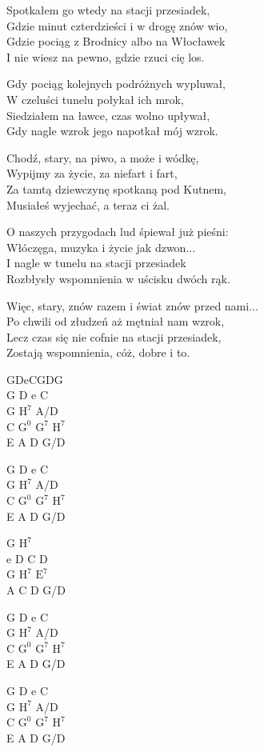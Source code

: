\begin{text}
    \hfill\break
    Spotkałem go wtedy na stacji przesiadek,\\
    Gdzie minut czterdzieści i w drogę znów wio,\\
    Gdzie pociąg z Brodnicy albo na Włocławek\\
    I nie wiesz na pewno, gdzie rzuci cię los.

    Gdy pociąg kolejnych podróżnych wypluwał,\\
    W czeluści tunelu połykał ich mrok,\\
    Siedziałem na ławce, czas wolno upływał,\\
    Gdy nagle wzrok jego napotkał mój wzrok.

    \vin Chodź, stary, na piwo, a może i wódkę,\\
    \vin Wypijmy za życie, za niefart i fart,\\
    \vin Za tamtą dziewczynę spotkaną pod Kutnem,\\
    \vin Musiałeś wyjechać, a teraz ci żal.

    O naszych przygodach lud śpiewał już pieśni:\\
    Włóczęga, muzyka i życie jak dzwon...\\
    I nagle w tunelu na stacji przesiadek\\
    Rozbłysły wspomnienia w uścisku dwóch rąk.

    Więc, stary, znów razem i świat znów przed nami...\\
    Po chwili od złudzeń aż mętniał nam wzrok,\\
    Lecz czas się nie cofnie na stacji przesiadek,\\
    Zostają wspomnienia, cóż, dobre i to.
\end{text}
\begin{chord}
    GDeCGDG\\
    G D e C\\
    G $\mathrm{H^7}$ A/D\\
    C $\mathrm{G^0}$ $\mathrm{G^7}$ $\mathrm{H^7}$\\
    E A D G/D

    G D e C\\
    G $\mathrm{H^7}$ A/D\\
    C $\mathrm{G^0}$ $\mathrm{G^7}$ $\mathrm{H^7}$\\
    E A D G/D

    G $\mathrm{H^7}$\\
    e D C D\\
    G $\mathrm{H^7}$ $\mathrm{E^7}$\\
    A C D G/D

    G D e C\\
    G $\mathrm{H^7}$ A/D\\
    C $\mathrm{G^0}$ $\mathrm{G^7}$ $\mathrm{H^7}$\\
    E A D G/D

    G D e C\\
    G $\mathrm{H^7}$ A/D\\
    C $\mathrm{G^0}$ $\mathrm{G^7}$ $\mathrm{H^7}$\\
    E A D G/D
\end{chord}
